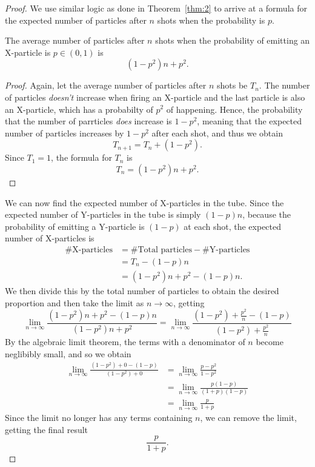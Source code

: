 \begin{proof}
  We use similar logic as done in Theorem~\ref{thm:2} to arrive at a formula for the expected number of particles after $n$ shots when the probability is $p$.
  \begin{claim}
    The average number of particles after $n$ shots when the probability of emitting an X-particle is $p \in (0, 1)$ is \[
      (1-p^2)n + p^2
    .\] 
  \end{claim}
  \begin{proof}
    Again, let the average number of particles after $n$ shots be $T_n$. The number of particles \emph{doesn't} increase when firing an X-particle and the last particle is also an X-particle, which has a probabilty of $p^2$ of happening. Hence, the probability that the number of parrticles \emph{does} increase is $1-p^2$, meaning that the expected number of particles increases by $1-p^2$ after each shot, and thus we obtain \[
      T_{n+1} = T_{n} + (1-p^2)
    .\] Since $T_1 = 1$, the formula for $T_{n}$ is \[
      T_{n} = (1-p^2)n + p^2 \tag*{\qedhere}
    .\] 
  \end{proof}
  We can now find the expected number of X-particles in the tube. Since the expected number of Y-particles in the tube is simply $(1 - p)n$, because the probability of emitting a Y-particle is $(1-p)$ at each shot, the expected number of X-particles is 
  \begin{align*}
    \#\text{X-particles} &= \#\text{Total particles} - \#\text{Y-particles} \\
                         &= T_n - (1-p)n \\
                         &= (1-p^2)n + p^2 - (1-p)n.
  \end{align*}
  We then divide this by the total number of particles to obtain the desired proportion and then take the limit as $n \to \infty$, getting 
  \begin{equation*}
    \lim_{n \to \infty} \frac{(1-p^2)n + p^2 - (1-p)n}{(1-p^2)n + p^2} = \lim_{n \to \infty} \frac{(1-p^2) + \frac{p^2}{n} - (1-p)}{(1-p^2) + \frac{p^2}{n}}
  \end{equation*}
  By the algebraic limit theorem, the terms with a denominator of $n$ become neglibibly small, and so we obtain 
  \begin{align*}
    \lim_{n \to \infty} \frac{(1-p^2) + 0 - (1-p)}{(1-p^2) + 0} &= \lim_{n \to \infty} \frac{p - p^2}{1 - p^2} \\
                                                                &= \lim_{n \to \infty} \frac{p(1 - p)}{(1+p)(1-p)} \\
                                                                &= \lim_{n \to \infty} \frac{p}{1+p}
  \end{align*}
  Since the limit no longer has any terms containing $n$, we can remove the limit, getting the final result \[
    \frac{p}{1+p} \tag*{\qedhere}
  .\] 
\end{proof}
